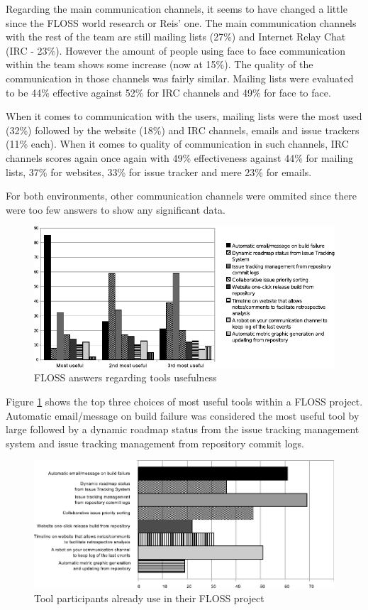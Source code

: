 \documentclass[lnbip]{svmultln}
\begin{document}
Regarding the main communication channels, it seems to have changed a
little since the FLOSS world research or Reis' one. The main
communication channels with the rest of the team are still mailing
lists (27\%) and Internet Relay Chat (IRC - 23\%). However the amount
of people using face to face communication within the team shows some
increase (now at 15\%). The quality of the communication in those
channels was fairly similar. Mailing lists were evaluated to be 44\%
effective against 52\% for IRC channels and 49\% for face to face.

When it comes to communication with the users, mailing lists were the
most used (32\%) followed by the website (18\%) and IRC channels,
emails and issue trackers (11\% each). When it comes to quality of
communication in such channels, IRC channels scores again once again
with 49\% effectiveness against 44\% for mailing lists, 37\% for
websites, 33\% for issue tracker and mere 23\% for emails.

For both environments, other communication channels were ommited since
there were too few answers to show any significant data.

\begin{figure}[htb]
  \centering
  \includegraphics{floss-tools.pdf}
  \caption{FLOSS answers regarding tools usefulness}
  \label{fig:floss-tools}
\end{figure}

Figure \ref{fig:floss-tools} shows the top three choices of most
useful tools within a FLOSS project. Automatic email/message on build
failure was considered the most useful tool by large followed by a
dynamic roadmap status from the issue tracking management system and
issue tracking management from repository commit logs.

\begin{figure}[hbt]
  \centering
  \includegraphics[scale=.8]{floss-existingtools.pdf}
  \caption{Tool participants already use in their FLOSS project}
  \label{fig:floss-existingtools}
\end{figure}
\end{document}
